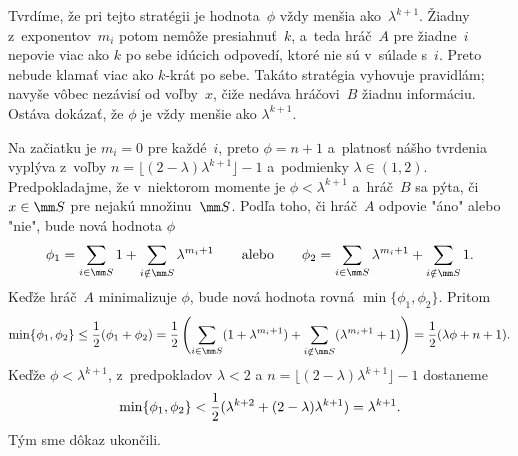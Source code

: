 {Tvrdíme, že pri tejto stratégii je hodnota~$\phi$ vždy menšia ako~$\lambda^{k+1}$. Žiadny z~exponentov~$m_i$ potom nemôže presiahnuť~$k$, a~teda hráč~$A$ pre žiadne~$i$ nepovie viac ako $k$ po sebe idúcich odpovedí, ktoré nie sú v~súlade s~$i$. Preto nebude klamať viac ako $k$-krát po sebe. Takáto stratégia vyhovuje pravidlám; navyše vôbec nezávisí od voľby~$x$, čiže nedáva hráčovi~$B$ žiadnu informáciu. Ostáva dokázať, že $\phi$ je vždy menšie ako $\lambda^{k+1}$.

Na začiatku je $m_i=0$ pre každé~$i$, preto $\phi=n+1$ a~platnosť nášho tvrdenia vyplýva z~voľby $n = \lfloor(2-\lambda)\lambda^{k+1}\rfloor -1$ a~podmienky $\lambda\in(1,2)$. Predpokladajme, že v~niektorom momente je $\phi<\lambda^{k+1}$ a~hráč~$B$ sa pýta, či $x\in\mm S$ pre nejakú množinu~$\mm S$. Podľa toho, či hráč~$A$ odpovie "áno" alebo "nie", bude nová hodnota $\phi$
$$
\phi_1=\sum_{i\in\mm S}1 + \sum_{i\notin\mm S} \lambda^{m_i+1}\qquad\text{alebo}\qquad \phi_2=\sum_{i\in\mm S}\lambda^{m_i+1} + \sum_{i\notin\mm S}1.
$$
Keďže hráč~$A$ minimalizuje $\phi$, bude nová hodnota rovná $\min\{\phi_1, \phi_2\}$. Pritom
$$
\min\{\phi_1, \phi_2\}\le {1\over 2}(\phi_1+\phi_2)=
{1\over 2}\left(\sum_{i\in\mm S}(1+\lambda^{m_i+1}) + \sum_{i\notin\mm S}(\lambda^{m_i+1}+1)\right)={1\over 2}(\lambda\phi+n+1).
$$
Keďže $\phi < \lambda^{k+1}$, z~predpokladov $\lambda<2$ a $n = \lfloor(2-\lambda)\lambda^{k+1}\rfloor -1$ dostaneme
$$
\min\{\phi_1, \phi_2\} < {1\over 2}(\lambda^{k+2}+(2-\lambda)\lambda^{k+1}) = \lambda^{k+1}.
$$
Tým sme dôkaz ukončili.
}

